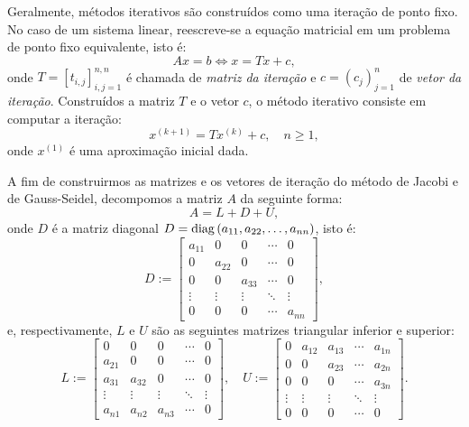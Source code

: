 Geralmente, métodos iterativos são construídos como uma iteração de ponto fixo. No caso de um sistema linear, reescreve-se a equação matricial em um problema de ponto fixo equivalente, isto é:
\begin{equation*}
  Ax = b \Leftrightarrow x = Tx + c,
\end{equation*}
onde $T = [t_{i,j}]_{i,j=1}^{n,n}$ é chamada de \emph{matriz da iteração} e $c = (c_j)_{j=1}^n$ de \emph{vetor da iteração}. Construídos a matriz $T$ e o vetor $c$, o método iterativo consiste em computar a iteração:
\begin{equation*}
  x^{(k+1)} = Tx^{(k)} + c,\quad n\geq 1,
\end{equation*}
onde $x^{(1)}$ é uma aproximação inicial dada.

A fim de construirmos as matrizes e os vetores de iteração do método de Jacobi e de Gauss-Seidel, decompomos a matriz $A$ da seguinte forma:
\begin{equation*}
  A = L + D + U,
\end{equation*}
onde $D$ é a matriz diagonal $D = \operatorname{diag}\,(a_{11}, a_{22}, \ldots, a_{nn})$, isto é:
\begin{equation*}
  D := \begin{bmatrix}
    a_{11} & 0 & 0 & \cdots & 0\\
    0 & a_{22} & 0 & \cdots & 0\\
    0 & 0 & a_{33} & \cdots & 0\\
    \vdots & \vdots & \vdots & \ddots & \vdots\\
    0 & 0 & 0 & \cdots & a_{nn}
  \end{bmatrix},
\end{equation*}
e, respectivamente, $L$ e $U$ são as seguintes matrizes triangular inferior e superior:
\begin{equation*}
  L := \begin{bmatrix}
    0 & 0 & 0 & \cdots & 0\\
    a_{21} & 0 & 0 & \cdots & 0\\
    a_{31} & a_{32} & 0 &\cdots & 0\\
    \vdots & \vdots & \vdots & \ddots & \vdots\\
    a_{n1} & a_{n2} & a_{n3} & \cdots & 0
  \end{bmatrix},\quad
  U := \begin{bmatrix}
    0 & a_{12} & a_{13} & \cdots & a_{1n}\\
    0 & 0 & a_{23} & \cdots & a_{2n}\\
    0 & 0 & 0 & \cdots & a_{3n}\\
    \vdots & \vdots & \vdots & \ddots & \vdots\\
    0 & 0 & 0 & \cdots & 0
  \end{bmatrix}.
\end{equation*}

